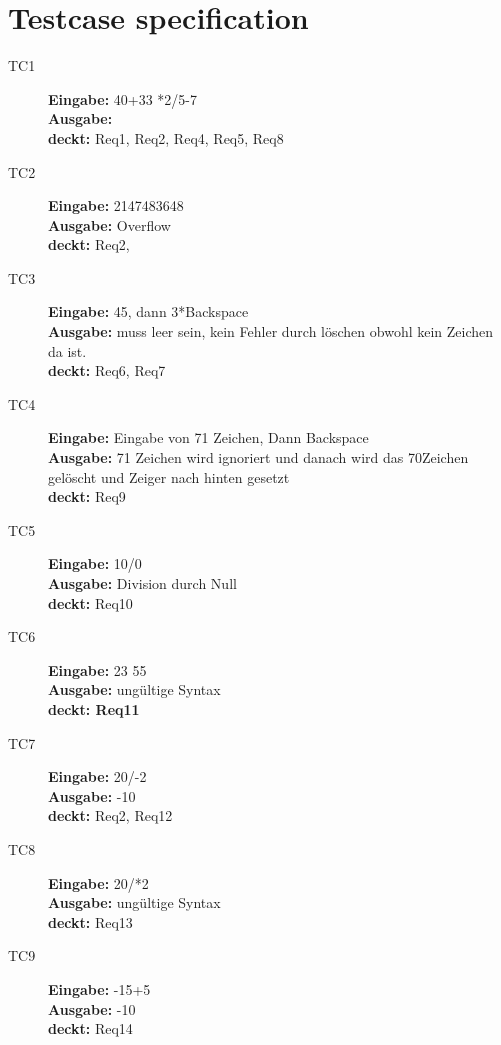 \section{Testcase specification}

\begin{description}
 \item[TC1] \textbf{Eingabe:} 40+33 *2/5-7\\
  \textbf{Ausgabe:} \\
  \textbf{deckt:} Req1, Req2, Req4, Req5, Req8

 \item[TC2] \textbf{Eingabe:} 2147483648\\
  \textbf{Ausgabe:} Overflow\\
  \textbf{deckt:} Req2,

\item[TC3] \textbf{Eingabe:} 45, dann 3*Backspace\\
  \textbf{Ausgabe:} muss leer sein, kein Fehler durch löschen obwohl kein Zeichen da ist.\\
  \textbf{deckt:} Req6, Req7

\item[TC4] \textbf{Eingabe:} Eingabe von 71 Zeichen, Dann Backspace\\
  \textbf{Ausgabe:} 71 Zeichen wird ignoriert und danach wird das 70Zeichen gelöscht und Zeiger nach hinten gesetzt\\
  \textbf{deckt:} Req9

 \item[TC5] \textbf{Eingabe:} 10/0\\
  \textbf{Ausgabe:} Division durch Null\\
  \textbf{deckt:} Req10

 \item[TC6] \textbf{Eingabe:} 23 55\\
  \textbf{Ausgabe:} ungültige Syntax\\
  \textbf{deckt: Req11}

 \item[TC7] \textbf{Eingabe:} 20/-2\\
  \textbf{Ausgabe:} -10\\
  \textbf{deckt:} Req2, Req12

 \item[TC8] \textbf{Eingabe:} 20/*2\\
  \textbf{Ausgabe:} ungültige Syntax\\
  \textbf{deckt:} Req13

 \item[TC9] \textbf{Eingabe:} -15+5\\
  \textbf{Ausgabe:} -10\\
  \textbf{deckt:} Req14


\end{description}
